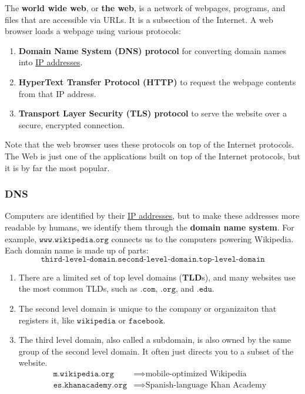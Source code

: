 \documentclass{article}
\newcounter{definition}[section]
\newcounter{example}[section]
\begin{document}
  \begin{definition}
    \label{def:world-wide-web}
  The \textbf{world wide web}, or \textbf{the web}, is a network of webpages, programs, and files that are accessible via URLs. It is a subsection of the Internet. A web browser loads a webpage using various protocols: 
  \begin{enumerate}
      \item \textbf{Domain Name System (DNS) protocol} for converting domain names into \hyperref[def:ip-addresses]{IP addresses}. 
      \item \textbf{HyperText Transfer Protocol (HTTP)} to request the webpage contents from that IP address. 
      \item \textbf{Transport Layer Security (TLS) protocol} to serve the website over a secure, encrypted connection. 
  \end{enumerate}
  Note that the web browser uses these protocols on top of the Internet protocols. The Web is just one of the applications built on top of the Internet protocols, but it is by far the most popular. 
  \end{definition}

  \subsubsection{DNS}
  \begin{definition}
    \label{def:domain-name-system}
  Computers are identified by their \hyperref[def:ip-addresses]{IP addresses}, but to make these addresses more readable by humans, we identify them through the \textbf{domain name system}. For example, $\texttt{www.wikipedia.org}$ connects us to the computers powering Wikipedia. Each domain name is made up of parts: 
  \begin{equation}
    \texttt{third-level-domain.second-level-domain.top-level-domain}
  \end{equation}
  \begin{enumerate}
      \item There are a limited set of top level domains (\textbf{TLD}s), and many websites use the most common TLDs, such as $\texttt{.com}$, $\texttt{.org}$, and $\texttt{.edu}$. 
      \item The second level domain is unique to the company or organizaiton that registers it, like $\texttt{wikipedia}$ or $\texttt{facebook}$. 
      \item The third level domain, also called a subdomain, is also owned by the same group of the second level domain. It often just directs you to a subset of the website. 
      \begin{align*}
          \texttt{m.wikipedia.org} & \implies \text{mobile-optimized Wikipedia} \\
          \texttt{es.khanacademy.org} & \implies \text{Spanish-language Khan Academy}
      \end{align*}
  \end{enumerate}
  \end{definition}
\end{document}
